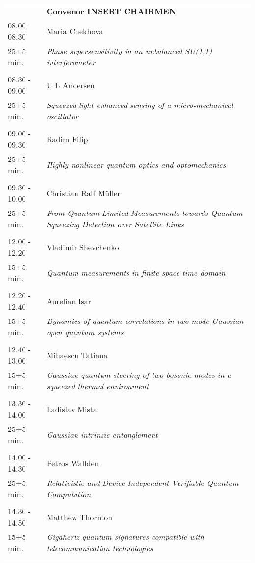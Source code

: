 \begin{longtable}{p{3cm}p{13cm}}
&\hfill {\bf Convenor INSERT CHAIRMEN }\\ 
08.00 - 08.30 & Maria Chekhova\\ 
25+5 min. & {\it Phase supersensitivity in an unbalanced SU(1,1) interferometer}\\ 
 & \\ 
08.30 - 09.00 & U L Andersen\\ 
25+5 min. & {\it Squeezed light enhanced sensing of a micro-mechanical oscillator}\\ 
 & \\ 
09.00 - 09.30 & Radim Filip\\ 
25+5 min. & {\it Highly nonlinear quantum optics and optomechanics}\\ 
 & \\ 
09.30 - 10.00 & Christian Ralf Müller\\ 
25+5 min. & {\it From Quantum-Limited Measurements towards Quantum Squeezing Detection over Satellite Links}\\ 
 & \\ 
12.00 - 12.20 & Vladimir Shevchenko\\ 
15+5 min. & {\it Quantum measurements in finite space-time domain}\\ 
 & \\ 
12.20 - 12.40 & Aurelian Isar\\ 
15+5 min. & {\it Dynamics of quantum correlations in two-mode Gaussian open quantum systems}\\ 
 & \\ 
12.40 - 13.00 & Mihaescu Tatiana\\ 
15+5 min. & {\it Gaussian quantum steering of two bosonic modes in a squeezed thermal environment}\\ 
 & \\ 
13.30 - 14.00 & Ladislav Mista\\ 
25+5 min. & {\it Gaussian intrinsic entanglement}\\ 
 & \\ 
14.00 - 14.30 & Petros Wallden\\ 
25+5 min. & {\it Relativistic and Device Independent Verifiable Quantum Computation}\\ 
 & \\ 
14.30 - 14.50 & Matthew Thornton\\ 
15+5 min. & {\it Gigahertz quantum signatures compatible with telecommunication technologies}\\ 
 & \\ 

\end{longtable}
